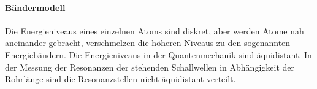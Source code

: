 \paragraph{Bändermodell}
Die Energieniveaus eines einzelnen Atoms sind diskret, aber werden Atome nah aneinander gebracht, verschmelzen die höheren Niveaus zu den sogenannten Energiebändern.
Die Energieniveaus in der Quantenmechanik sind äquidistant.
In der Messung der Resonanzen der stehenden Schallwellen in Abhängigkeit der Rohrlänge sind die Resonanzstellen nicht äquidistant verteilt.

%
